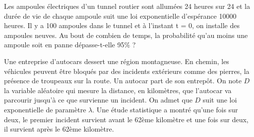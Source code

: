 \documentclass[../PolyS4.tex]{subfiles}
\begin{document}




Les ampoules électriques d'un tunnel routier sont allumées 24 heures sur 24 et la durée
de vie de chaque ampoule suit une loi exponentielle d'espérance 10000 heures. Il y a
100 ampoules dans le tunnel et à l'instant t = 0, on installe des ampoules neuves.
Au bout de combien de temps, la probabilité qu'au moins une ampoule soit en panne
dépasse-t-elle 95\% ?\\




\newpage


Une entreprise d'autocars dessert une région montagneuse. En chemin, les véhicules peuvent être bloqués par des incidents extérieurs comme des pierres, la présence de troupeaux sur la route. Un autocar part de son entrepôt. On note $D$ la variable aléatoire qui mesure la distance, en kilomètres, que l'autocar va parcourir jusqu'à ce que survienne un incident. On admet que $D$ suit une loi exponentielle de paramètre $\lambda$. Une étude statistique a montré qu'une fois sur deux, le premier incident survient avant le 62ème kilomètre et une fois sur deux, il survient après le 62ème kilomètre. 
\end{document}
